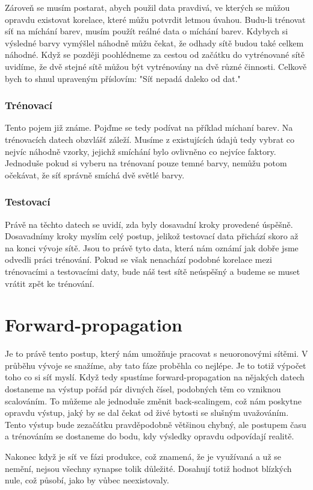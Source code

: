 \documentclass[12pt,a4paper]{report}
\begin{document}
	Zároveň se musím postarat, abych použil data pravdivá, ve kterých se můžou opravdu existovat korelace, které můžu potvrdit letmou úvahou. Budu-li trénovat síť na míchání barev, musím použít reálné data o míchání barev. Kdybych si výsledné barvy vymýšlel náhodně můžu čekat, že odhady sítě budou také celkem náhodné. Když se později poohlédneme za cestou od začátku do vytrénované sítě uvidíme, že dvě stejné sítě můžou být vytrénovány na dvě různé činnosti. Celkově bych to shnul upraveným příslovím: "Síť nepadá daleko od dat."
		\subsection{Trénovací}
		Tento pojem již známe. Pojďme se tedy podívat na příklad míchaní barev. Na trénovacích datech obzvlášť záleží. Musíme z existujících údajů tedy vybrat co nejvíc náhodně vzorky, jejichž smíchání bylo ovlivněno co nejvíce faktory. Jednoduše pokud si vyberu na trénovaní pouze temné barvy, nemůžu potom očekávat, že síť správně smíchá dvě světlé barvy.
		\subsection{Testovací}
		Právě na těchto datech se uvidí, zda byly dosavadní kroky provedené úspěšně. Dosavadnímy kroky myslím celý postup, jelikož testovací data přichází skoro až na konci vývoje sítě. Jsou to právě tyto data, která nám oznámí jak dobře jsme odvedli práci trénování. Pokud se však nenachází podobné korelace mezi trénovacími a testovacími daty, bude náš test sítě neúspěšný a budeme se muset vrátit zpět ke trénování.
\chapter{Forward-propagation}
	Je to právě tento postup, který nám umožňuje pracovat s neuoronovými sítěmi. V průběhu vývoje se snažíme, aby tato fáze proběhla co nejlépe. Je to totiž výpočet toho co si síť myslí. Když tedy spustíme forward-propagation na nějakých datech dostaneme na výstup pořád pár divných čísel, podobných těm co vzniknou scalováním. To můžeme ale jednoduše změnit back-scalingem, což nám poskytne opravdu výstup, jaký by se dal čekat od živé bytosti se slušným uvažováním. Tento výstup bude zezačátku pravděpodobně většinou chybný, ale postupem času a trénováním se dostaneme do bodu, kdy výsledky opravdu odpovídají realitě.
	
	Nakonec když je síť ve fázi produkce, což znamená, že je využívaná a už se nemění, nejsou všechny synapse tolik důležité. Dosahují totiž hodnot blízkých nule, což působí, jako by vůbec neexistovaly.
\end{document}
